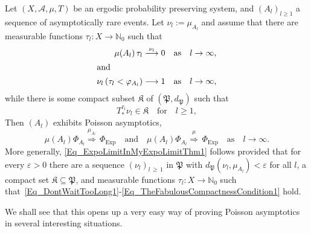 \documentclass[AHL,Unicode,longabstracts]{cedram}
\newcommand{\clA}{\mathcal{A}}
\newcommand{\Expl}{\mathrm{Exp}}
\newcommand{\frkK}{\mathfrak{K}}
\newcommand{\frkP}{\mathfrak{P}}
\newcommand{\bbN}{\mathbb{N}}
\begin{document}
\begin{theo}\label{T_MOreFlexiblePoissonLimitFromCompactness}
Let $(X,\clA,\mu,T)$ be an ergodic probability preserving system, and $(A_{l})_{l\geq1}$ a sequence of asymptotically rare events. Let $\nu_{l}:=\mu_{A_{l}}$ and assume that there are measurable functions $\tau_{l}:X\rightarrow\bbN_{0}$ such that
\begin{align}
\mu(A_{l})\,\tau_{l}\overset{\nu_{l}}{\longrightarrow}0 &\quad\text{as}\quad l\rightarrow\infty, \label{Eq_DontWaitTooLong1}
\\
\intertext{and}
\nu_{l}\left(\tau_{l}<\varphi_{A_{l}}\right) \longrightarrow1 &\quad\text{as}\quad l\rightarrow\infty,\label{Eq_HardlyAnyReturnsUpToTimeM1} 
\end{align}
while there is some compact subset $\frkK$ of $(\frkP,d_{\frkP})$ such that
\begin{equation}\label{Eq_TheFabulousCompactnessCondition1}
T_{\ast}^{\tau_{l}}\nu_{l}\in\frkK\quad\text{for}\quad l\geq1,
\end{equation}
Then $(A_{l})$ exhibits Poisson asymptotics,
\begin{equation}\label{Eq_ExpoLimitInMyExpoLimitThm1}
\mu(A_{l})\Phi_{A_{l}}\overset{\mu_{A_{l}}}{\Longrightarrow}\,\Phi _{\Expl}\quad\text{and}\quad\mu(A_{l})\Phi_{A_{l}}\overset{\mu }{\Longrightarrow}\,\Phi_{\Expl}\quad\text{as}\quad l\rightarrow
\infty. 
\end{equation}
More generally, \eqref{Eq_ExpoLimitInMyExpoLimitThm1} follows provided that for every $\varepsilon>0$ there are a sequence $(\nu_{l})_{l\,\geq\,1}$ in $\frkP$ with $d_{\frkP}(\nu_{l},\mu_{A_{l}})<\varepsilon$ for all $l$, a compact set $\frkK\subseteq\frkP$, and measurable functions $\tau_{l}:X\rightarrow\bbN_{0}$ such that~\eqref{Eq_DontWaitTooLong1}-\eqref{Eq_TheFabulousCompactnessCondition1} hold.
\end{theo}




We shall see that this opens up a very easy way of proving Poisson asymptotics in several interesting situations.

\end{document}
